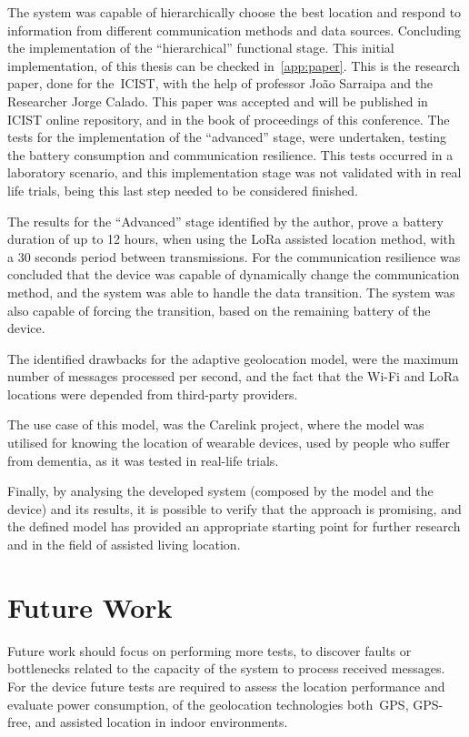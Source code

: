 The system was capable of hierarchically choose the best location and respond to information from different communication methods and data sources. Concluding the implementation of the “hierarchical” functional stage.
This initial implementation, of this thesis can be checked in~\ref{app:paper}. This is the research paper, done for the~\gls{ICIST}, with the help of professor João Sarraipa and the Researcher Jorge Calado. This paper was accepted and will be  published in ICIST online repository, and in the  book of proceedings of this conference. The tests for the implementation of the “advanced” stage, were undertaken, testing the battery consumption and communication resilience. This tests occurred in a laboratory scenario, and this implementation stage was not validated with in real life trials, being this last step needed to be considered finished.

The results for the “Advanced” stage identified by the author, prove a battery duration of up to 12 hours, when using the LoRa assisted location method, with a 30 seconds period between transmissions. For the communication resilience was concluded that the device was capable of dynamically change the communication method, and the system was able to handle the data transition. The system was also capable of forcing the transition, based on the remaining battery of the device.

The identified drawbacks for the adaptive geolocation model, were the maximum number of messages processed per second, and the fact that the Wi-Fi and LoRa locations were depended from third-party providers.


The use case of this model, was the Carelink project, where the model was utilised for knowing the location of wearable devices, used by people who suffer from dementia, as it was tested in real-life trials.


Finally, by analysing the developed system (composed by the model and the device) and its results, it is possible to verify that the approach is promising, and the defined model has provided an appropriate starting point for further research and in the field of assisted living location.

\section{Future Work}
\label{sec:Future_work}

Future work should focus on performing more tests, to discover faults or bottlenecks related to the capacity of the system to process received messages. For the device future tests are required to assess the location performance and evaluate power consumption, of the geolocation technologies both~\gls{GPS}, GPS-free, and assisted location in indoor environments.

